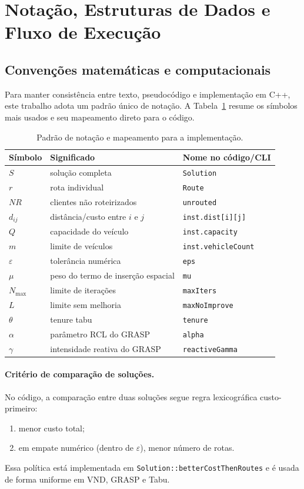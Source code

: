 \section{Notação, Estruturas de Dados e Fluxo de Execução}
\label{sec:notacao_fluxo}

\subsection{Convenções matemáticas e computacionais}

Para manter consistência entre texto, pseudocódigo e implementação em C++, este trabalho adota um padrão único de notação.
A Tabela~\ref{tab:padrao_notacao} resume os símbolos mais usados e seu mapeamento direto para o código.

\begin{table}[htbp]
\centering
\caption{Padrão de notação e mapeamento para a implementação.}
\label{tab:padrao_notacao}
\begin{tabular}{lll}
\hline
Símbolo & Significado & Nome no código/CLI \\
\hline
$S$ & solução completa & \texttt{Solution} \\
$r$ & rota individual & \texttt{Route} \\
$NR$ & clientes não roteirizados & \texttt{unrouted} \\
$d_{ij}$ & distância/custo entre $i$ e $j$ & \texttt{inst.dist[i][j]} \\
$Q$ & capacidade do veículo & \texttt{inst.capacity} \\
$m$ & limite de veículos & \texttt{inst.vehicleCount} \\
$\varepsilon$ & tolerância numérica & \texttt{eps} \\
$\mu$ & peso do termo de inserção espacial & \texttt{mu} \\
$N_{\max}$ & limite de iterações & \texttt{maxIters} \\
$L$ & limite sem melhoria & \texttt{maxNoImprove} \\
$\theta$ & tenure tabu & \texttt{tenure} \\
$\alpha$ & parâmetro RCL do GRASP & \texttt{alpha} \\
$\gamma$ & intensidade reativa do GRASP & \texttt{reactiveGamma} \\
\hline
\end{tabular}
\end{table}

\paragraph{Critério de comparação de soluções.}
No código, a comparação entre duas soluções segue regra lexicográfica custo-primeiro:
\begin{enumerate}
  \item menor custo total;
  \item em empate numérico (dentro de $\varepsilon$), menor número de rotas.
\end{enumerate}
Essa política está implementada em \texttt{Solution::betterCostThenRoutes} e é usada de forma uniforme em VND, GRASP e Tabu.

